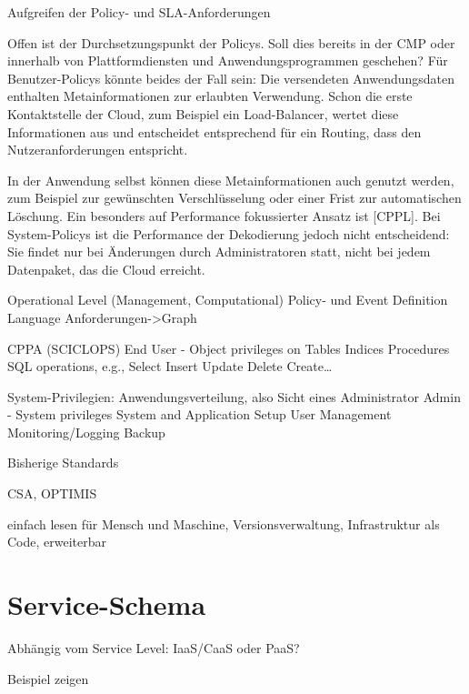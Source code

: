 Aufgreifen der Policy- und SLA-Anforderungen

Offen ist der Durchsetzungspunkt der Policys. Soll dies bereits in der CMP oder innerhalb von Plattformdiensten und Anwendungsprogrammen geschehen? Für Benutzer-Policys könnte beides der Fall sein: Die versendeten Anwendungsdaten enthalten Metainformationen zur erlaubten Verwendung. Schon die erste Kontaktstelle der Cloud, zum Beispiel ein Load-Balancer, wertet diese Informationen aus und entscheidet entsprechend für ein Routing, dass den Nutzeranforderungen entspricht. 

In der Anwendung selbst können diese Metainformationen auch genutzt werden, zum Beispiel zur gewünschten Verschlüsselung oder einer Frist zur automatischen Löschung. Ein besonders auf Performance fokussierter Ansatz ist [CPPL]. Bei System-Policys ist die Performance der Dekodierung jedoch nicht entscheidend: Sie findet nur bei Änderungen durch Administratoren statt, nicht bei jedem Datenpaket, das die Cloud erreicht.

Operational Level (Management, Computational)
Policy- und Event Definition Language
Anforderungen->Graph

CPPA (SCICLOPS) End User - Object privileges on 
Tables 
Indices 
Procedures 
SQL operations, e.g.,  
Select 
Insert 
Update 
Delete 
Create… 

System-Privilegien: Anwendungsverteilung, also Sicht eines Administrator
Admin - System privileges 
System and Application Setup 
User Management
Monitoring/Logging
Backup

Bisherige Standards

CSA, OPTIMIS

einfach lesen für Mensch und Maschine, Versionsverwaltung, Infrastruktur als Code, erweiterbar

\section{Service-Schema}

Abhängig vom Service Level: IaaS/CaaS oder PaaS?

Beispiel zeigen

